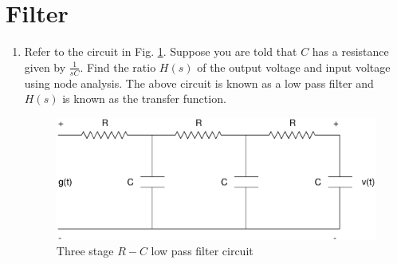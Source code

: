 \documentclass[journal,12pt,twocolumn]{IEEEtran}
\renewcommand\thesection{\arabic{section}}
\begin{document}
\section{Filter}
%

%
\begin{enumerate}[label=\thesection.\arabic*
,ref=\thesection.\theenumi]

\item
Refer to the circuit in Fig. \ref{fig:2.1}. Suppose you are told that $C$ has a resistance given by $\frac{1}{s  C}$.   Find the ratio $H(s)$ of the output voltage and input voltage using node analysis.  The above circuit is known as a low pass filter and $H(s)$ is known as the transfer function.

%
%
\begin{figure}[!h]
\centering
\includegraphics[width=\columnwidth]{./figs/2.1.eps}
\caption{Three stage $R-C$ low pass filter circuit}
\label{fig:2.1}
\end{figure}
%


\end{enumerate}
\end{document}
